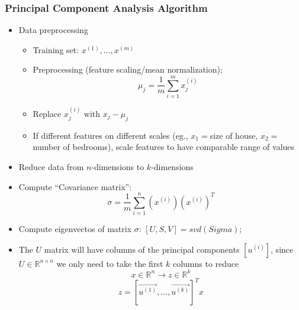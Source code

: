 \subsubsection{Principal Component Analysis Algorithm}
\begin{itemize}[--]
	\item Data preprocessing
	\begin{itemize}[--]
		\item Training set: $x^{(1)},\ldots, x^{(m)}$
		\item Preprocessing (feature scaling/mean normalization);
			$$\mu_j = \frac{1}{m}\sum_{i=1}^{m}x_j^{(i)}$$
		\item Replace $x_j^{(i)}$ with $x_j - \mu_j$
		\item If different features on different scales (eg., $x_1=$size of house, $x_2=$ number of bedrooms), scale features to have comparable range of values
	\end{itemize}

	\item Reduce data from $n$-dimensions to $k$-dimensions
	\item Compute ``Covariance matrix'':
		$$\sigma = \frac{1}{m}\sum_{i=1}^{n} (x^{(i)})(x^{(i)})^T$$
	\item Compute eigenvectos of matrix $\sigma$: $[U, S, V] = svd(Sigma);$
	\item The $U$ matrix will have columns of the principal components $[u^{(i)}]$, since $U\in\mathbb{R}^{n\times n}$ we only need to take the first $k$ columns to reduce
		$$x\in\mathbb{R}^n\to z\in\mathbb{R}^k$$
		$$z= [\vec{u^{(1)}}, \ldots, \vec{u^{(k)}}]^{T} x $$
\end{itemize}


